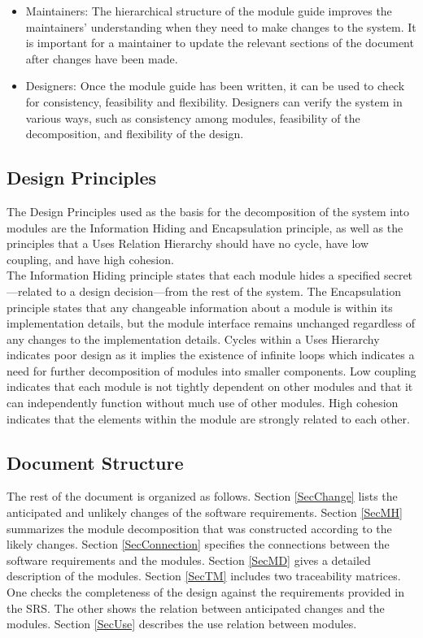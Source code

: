 \documentclass[12pt, titlepage]{article}
\begin{document}
\begin{itemize}
\item Maintainers: The hierarchical structure of the module guide improves the
  maintainers' understanding when they need to make changes to the system. It is
  important for a maintainer to update the relevant sections of the document
  after changes have been made.
\item Designers: Once the module guide has been written, it can be used to
  check for consistency, feasibility and flexibility. Designers can verify the
  system in various ways, such as consistency among modules, feasibility of the
  decomposition, and flexibility of the design.
\end{itemize}

\subsection{Design Principles}
The Design Principles used as the basis for the decomposition of the system into modules are the Information Hiding and Encapsulation principle, as well as the principles that a Uses Relation Hierarchy should have no cycle, have low coupling, and have high cohesion. \\

\noindent The Information Hiding principle states that each module hides a specified secret—related to a design decision—from the rest of the system. The Encapsulation principle states that any changeable information about a module is within its implementation details, but the module interface remains unchanged regardless of any changes to the implementation details. Cycles within a Uses Hierarchy indicates poor design as it implies the existence of infinite loops which indicates a need for further decomposition of modules into smaller components. Low coupling indicates that each module is not tightly dependent on other modules and that it can independently function without much use of other modules. High cohesion indicates that the elements within the module are strongly related to each other.

\subsection{Document Structure}
The rest of the document is organized as follows. Section
\ref{SecChange} lists the anticipated and unlikely changes of the software
requirements. Section \ref{SecMH} summarizes the module decomposition that
was constructed according to the likely changes. Section \ref{SecConnection}
specifies the connections between the software requirements and the
modules. Section \ref{SecMD} gives a detailed description of the
modules. Section \ref{SecTM} includes two traceability matrices. One checks
the completeness of the design against the requirements provided in the SRS. The
other shows the relation between anticipated changes and the modules. Section
\ref{SecUse} describes the use relation between modules.
\end{document}

